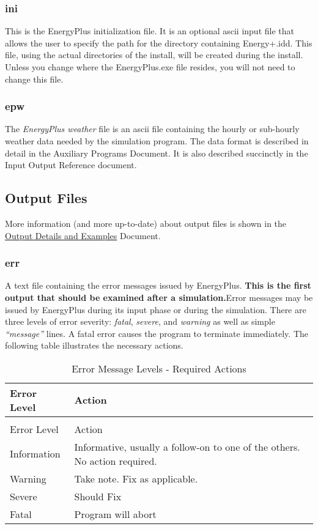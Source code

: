 \subsubsection{ini}\label{ini}

This is the EnergyPlus initialization file. It is an optional ascii input file that allows the user to specify the path for the directory containing Energy+.idd. This file, using the actual directories of the install, will be created during the install. Unless you change where the EnergyPlus.exe file resides, you will not need to change this file.

\subsubsection{epw}\label{epw}

The \emph{EnergyPlus weather} file is an ascii file containing the hourly or sub-hourly weather data needed by the simulation program. The data format is described in detail in the Auxiliary Programs Document. It is also described succinctly in the Input Output Reference document.

\subsection{Output Files}\label{output-files}

More information (and more up-to-date) about output files is shown in the \href{file:///E:/Docs4PDFs/OutputDetailsAndExamples.pdf}{Output Details and Examples} Document.

\subsubsection{err}\label{err}

A text file containing the error messages issued by EnergyPlus. \textbf{This is the first output that should be examined after a simulation.}Error messages may be issued by EnergyPlus during its input phase or during the simulation. There are three levels of error severity: \emph{fatal}, \emph{severe}, and \emph{warning} as well as simple \emph{``message''} lines. A fatal error causes the program to terminate immediately. The following table illustrates the necessary actions.

\begin{longtable}[c]{p{1.5in}p{4.5in}}
\caption{Error Message Levels - Required Actions \label{table:error-message-levels-required-actions}} \tabularnewline
\toprule 
Error Level & Action \tabularnewline
\midrule
\endfirsthead

\caption[]{Error Message Levels - Required Actions} \tabularnewline
\toprule 
Error Level & Action \tabularnewline
\midrule
\endhead

Information & Informative, usually a follow-on to one of the others. No action required. \tabularnewline
Warning & Take note. Fix as applicable. \tabularnewline
Severe & Should Fix \tabularnewline
Fatal & Program will abort \tabularnewline
\bottomrule
\end{longtable}

